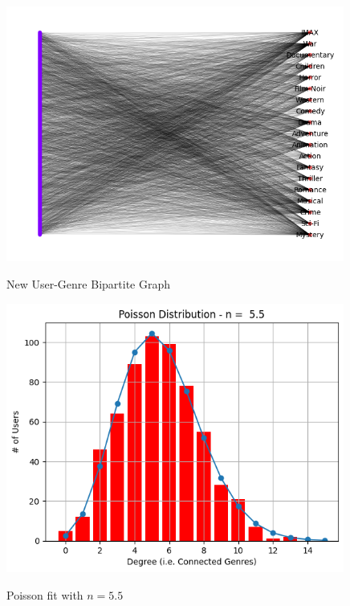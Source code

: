 \documentclass[12pt]{article}
\numberwithin{equation}{section}
\begin{document}
\begin{figure}[h!]
    \begin{minipage}[b]{0.5\linewidth}
         \centering
  	\includegraphics[width=0.99\textwidth]{newgenrebipartite.png}
  	\label{fig:fanspergenre}
	 \caption{New User-Genre Bipartite Graph}
    \end{minipage} 
    \hspace{0.1cm}
    \begin{minipage}[b]{0.5\linewidth}
         \centering
  	\includegraphics[width=0.99\textwidth]{poissondegree.png}
  	\label{fig:fanspergenre}
	 \caption{Poisson fit with $n = 5.5$}
    \end{minipage} 
\end{figure}
\end{document}
